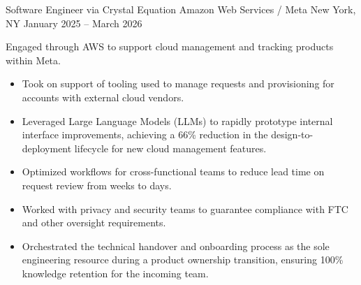 

\begin{cventries}

	\cventry
		{Software Engineer via Crystal Equation} %
		{Amazon Web Services / Meta} %
		{New York, NY} %
		{January 2025 – March 2026} %
		{
			\begin{cvitems} %
				\item {Engaged through AWS to support cloud management and tracking products within Meta.}
				\begin{itemize}
					\item {Took on support of tooling used to manage requests and provisioning for accounts with external cloud vendors.}
					\item {Leveraged Large Language Models (LLMs) to rapidly prototype internal interface improvements, achieving a 66\% reduction in the design-to-deployment lifecycle for new cloud management features.}
					\item {Optimized workflows for cross-functional teams to reduce lead time on request review from weeks to days.}
					\item {Worked with privacy and security teams to guarantee compliance with FTC and other oversight requirements.}
					\item {Orchestrated the technical handover and onboarding process as the sole engineering resource during a product ownership transition, ensuring 100\% knowledge retention for the incoming team.}
				\end{itemize}
			\end{cvitems}
		}


\end{cventries}
